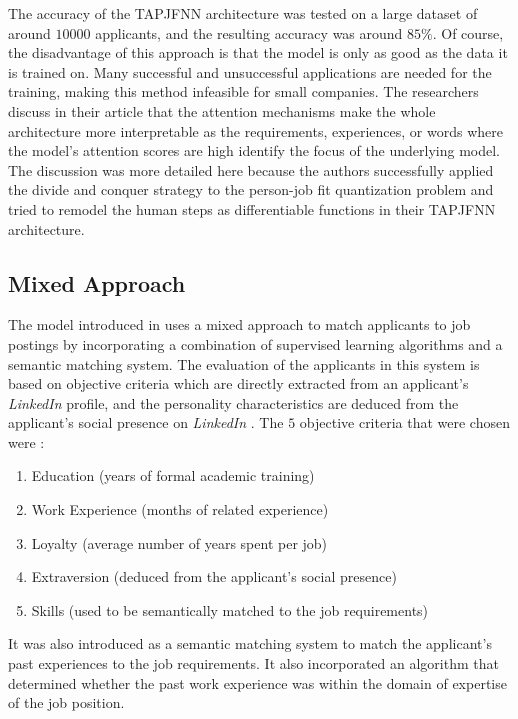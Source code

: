 \documentclass[draft,final]{thesisclass} %
\begin{document}
The accuracy of the \acs{TAPJFNN} architecture was tested on a large dataset of around $10000$ applicants, and the resulting accuracy was around $85\%$.
Of course, the disadvantage of this approach is that the model is only as good as the data it is trained on. Many successful and unsuccessful applications are needed for the training, making this method infeasible for small companies.
The researchers discuss in their article that the attention mechanisms make the whole architecture more interpretable as the requirements, experiences, or words where the model's attention scores are high identify the focus of the underlying model.
The discussion was more detailed here because the authors successfully applied the divide and conquer strategy to the person-job fit quantization problem and tried to remodel the human steps as differentiable functions in their \acs{TAPJFNN} architecture.

\subsection{Mixed Approach}
The model introduced in \textcite[517]{applicant_semantic_matching} uses a mixed approach to match applicants to job postings by incorporating a combination of supervised learning algorithms and a semantic matching system.
The evaluation of the applicants in this system is based on objective criteria which are directly extracted from an applicant's \textit{LinkedIn} profile, and the personality characteristics are deduced from the applicant's social presence on \textit{LinkedIn} \parencite[517]{applicant_semantic_matching}.
The $5$ objective criteria that were chosen were \parencite[518]{applicant_semantic_matching}:
\begin{enumerate}
    \item Education (years of formal academic training)
    \item Work Experience (months of related experience)
    \item Loyalty (average number of years spent per job)
    \item Extraversion (deduced from the applicant's social presence)
    \item Skills (used to be semantically matched to the job requirements)
\end{enumerate}
It was also introduced as a semantic matching system to match the applicant's past experiences to the job requirements. It also incorporated an algorithm that determined whether the past work experience was within the domain of expertise of the job position.
\end{document}
